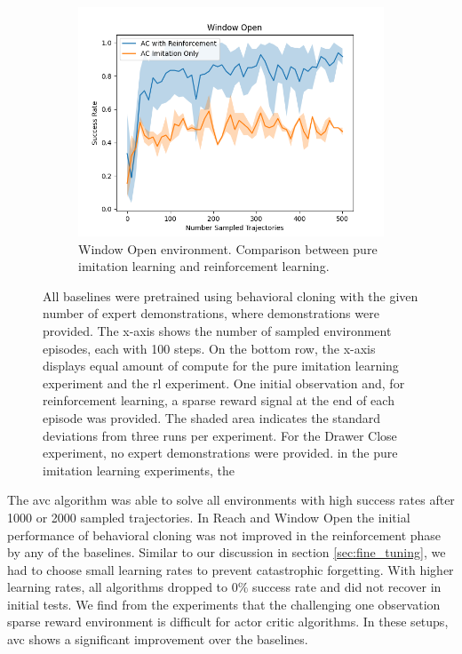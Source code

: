 \begin{figure}[htbp]
\begin{subfigure}[t]{0.45\textwidth}
      \includegraphics[width=\textwidth]{images/1_2000_imi/Window Open.png}
      \caption{Window Open environment. Comparison between pure imitation learning and reinforcement learning.}
    \end{subfigure}
    \caption{
    All baselines were pretrained using behavioral cloning with the given number of expert demonstrations, where demonstrations were provided. 
    The x-axis shows the number of sampled environment episodes, each with 100 steps. On the bottom row, 
    the x-axis displays equal amount of compute for the pure imitation learning experiment and the \ac{rl} experiment. 
    One initial observation and, for reinforcement learning, a sparse reward signal at the end of each episode was provided. 
    The shaded area indicates the standard deviations from three runs per experiment. 
    For the Drawer Close experiment, no expert demonstrations were provided. in the pure imitation learning experiments, the }
    \label{fig:guided_ref}
\end{figure}

The \ac{avc} algorithm was able to solve all environments with high success rates after 1000 or 2000 sampled trajectories. In Reach and Window Open the initial performance
of behavioral cloning was not improved in the reinforcement phase by any of the baselines. Similar to our discussion in section \ref{sec:fine_tuning},
we had to choose small learning rates to prevent catastrophic forgetting. With higher learning rates, all algorithms dropped to $0 \%$ success rate and did
not recover in initial tests. We find from the experiments that the challenging one observation sparse reward environment is difficult for
actor critic algorithms. In these setups, \ac{avc} shows a significant improvement over the baselines.\\

